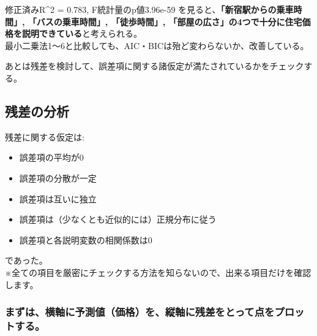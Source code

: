 \documentclass[a4paper,dvipdfmx]{jsarticle}
\providecommand{\tightlist}{%
      \setlength{\itemsep}{0pt}\setlength{\parskip}{0pt}}
\begin{document}
    修正済みR\^{}2 = 0.783, F統計量のp値3.96e-59
を見ると、\textbf{「新宿駅からの乗車時間」, 「バスの乗車時間」,
「徒歩時間」,
「部屋の広さ」の4つで十分に住宅価格を説明できている}と考えられる。\\
最小二乗法1〜6と比較しても、AIC・BICは殆ど変わらないか、改善している。

あとは残差を検討して、誤差項に関する諸仮定が満たされているかをチェックする。

    \subsection{残差の分析}\label{ux6b8bux5deeux306eux5206ux6790}

残差に関する仮定は:

\begin{itemize}
\tightlist
\item
  誤差項の平均が0
\item
  誤差項の分散が一定
\item
  誤差項は互いに独立
\item
  誤差項は（少なくとも近似的には）正規分布に従う
\item
  誤差項と各説明変数の相関係数は0
\end{itemize}

であった。\\
※全ての項目を厳密にチェックする方法を知らないので、出来る項目だけを確認します。

\subsubsection{まずは、横軸に予測値（価格）を、縦軸に残差をとって点をプロットする。}\label{ux307eux305aux306fux6a2aux8ef8ux306bux4e88ux6e2cux5024ux4fa1ux683cux3092ux7e26ux8ef8ux306bux6b8bux5deeux3092ux3068ux3063ux3066ux70b9ux3092ux30d7ux30edux30c3ux30c8ux3059ux308b}
\end{document}
